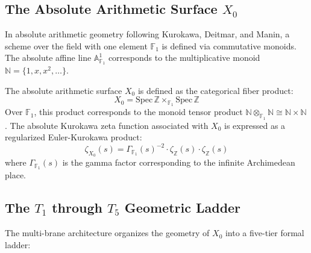 \documentclass[11pt,a4paper]{article}
\theoremstyle{definition}
\theoremstyle{remark}
\begin{document}
\subsection{The Absolute Arithmetic Surface $X_0$}
In absolute arithmetic geometry following Kurokawa, Deitmar, and Manin, a scheme over the field with one element $\mathbb{F}_1$ is defined via commutative monoids. The absolute affine line $\mathbb{A}^1_{\mathbb{F}_1}$ corresponds to the multiplicative monoid $\mathbb{N} = \{1, x, x^2, \dots\}$.

The absolute arithmetic surface $X_0$ is defined as the categorical fiber product:
\begin{equation}
X_0 = \mathrm{Spec}\,\mathbb{Z} \times_{\mathbb{F}_1} \mathrm{Spec}\,\mathbb{Z}
\end{equation}
Over $\mathbb{F}_1$, this product corresponds to the monoid tensor product $\mathbb{N} \otimes_{\mathbb{F}_1} \mathbb{N} \cong \mathbb{N} \times \mathbb{N}$. The absolute Kurokawa zeta function associated with $X_0$ is expressed as a regularized Euler-Kurokawa product:
\begin{equation}
\zeta_{X_0}(s) = \Gamma_{\mathbb{F}_1}(s)^{-2} \cdot \zeta_{\mathbb{Z}}(s) \cdot \zeta_{\mathbb{Z}}(s)
\end{equation}
where $\Gamma_{\mathbb{F}_1}(s)$ is the gamma factor corresponding to the infinite Archimedean place.

\subsection{The \texorpdfstring{$T_1$ through $T_5$}{T1 through T5} Geometric Ladder}
The multi-brane architecture organizes the geometry of $X_0$ into a five-tier formal ladder:
\end{document}
